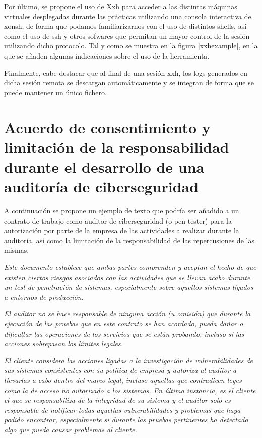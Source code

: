 Por último, se propone el uso de Xxh para acceder a las distintas máquinas virtuales desplegadas durante las prácticas utilizando una consola interactiva de xonsh, de forma que podamos familiarizarnos con el uso de distintos shells, así como el uso de ssh y otros sofwares que permitan un mayor control de la sesión utilizando dicho protocolo. Tal y como se muestra en la figura \ref{xxhexample}, en la que se añaden algunas indicaciones sobre el uso de la herramienta.



Finalmente, cabe destacar que al final de una sesión xxh, los logs generados en dicha sesión remota se descargan automáticamente y se integran de forma que se puede mantener un único fichero.

\section{Acuerdo de consentimiento y limitación de la responsabilidad durante el desarrollo de una auditoría de ciberseguridad}\label{acuerdo}

A continuación se propone un ejemplo de texto que podría ser añadido a un contrato de trabajo como auditor de ciberseguridad (o pen-tester) para la autorización por parte de la empresa de las actividades a realizar durante la auditoría, así como la limitación de la responsabilidad de las repercusiones de las mismas.

\textit{Este documento establece que ambas partes comprenden y aceptan el hecho de que existen ciertos riesgos asociados con las actividades que se llevan acabo durante un test de penetración de sistemas, especialmente sobre aquellos sistemas ligados a entornos de producción. }


\textit{El auditor no se hace responsable de ninguna acción (u omisión) que durante la ejecución de las pruebas que en este contrato se han acordado, pueda dañar o dificultar las operaciones de los servicios que se están probando, incluso si las acciones sobrepasan los límites legales. }

\textit{El cliente considera las acciones ligadas a la investigación de vulnerabilidades de sus sistemas consistentes con su política de empresa y autoriza al auditor a llevarlas a cabo dentro del marco legal, incluso aquellas que contradicen leyes como la de acceso no autorizado a los sistemas. En última instancia, es  el cliente el que se responsabiliza de la integridad de su sistema y el auditor solo es responsable de notificar todas aquellas vulnerabilidades y problemas que haya podido encontrar, especialmente si durante las pruebas pertinentes ha detectado algo que pueda causar problemas al cliente.
}